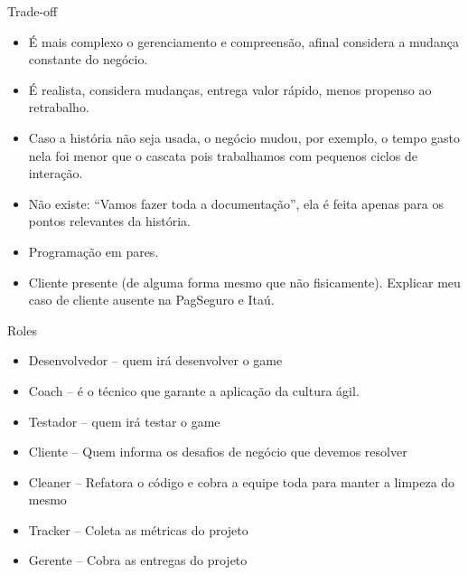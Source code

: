 \begin{frame}
\begin{block}{Trade-off}
	 \begin{itemize}
			\item É mais complexo o gerenciamento e compreensão, afinal considera a mudança constante do negócio.

			\item É realista, considera mudanças, entrega valor rápido, menos propenso ao retrabalho.
			
			\item Caso a história não seja usada, o negócio mudou, por exemplo, o tempo gasto nela foi menor que o cascata pois trabalhamos com pequenos ciclos de interação.
			
			\item Não existe: “Vamos fazer toda a documentação”, ela é feita apenas para os pontos relevantes da história.
			
			\item Programação em pares.
			
			\item Cliente presente (de alguma forma mesmo que não fisicamente). Explicar meu caso de cliente ausente na PagSeguro e Itaú.

	 \end{itemize}
\end{block}
\end{frame}

\begin{frame}
\begin{block}{Roles}
	 \begin{itemize}
			\item Desenvolvedor – quem irá desenvolver o game

			\item Coach – é o técnico que garante a aplicação da cultura ágil.
			
			\item Testador – quem irá testar o game
			
			\item Cliente – Quem informa os desafios de negócio que devemos resolver
			
			\item Cleaner – Refatora o código e cobra a equipe toda para manter a limpeza do mesmo
			
			\item Tracker – Coleta as métricas do projeto
			
			\item Gerente – Cobra as entregas do projeto

	 \end{itemize}
\end{block}
\end{frame}

